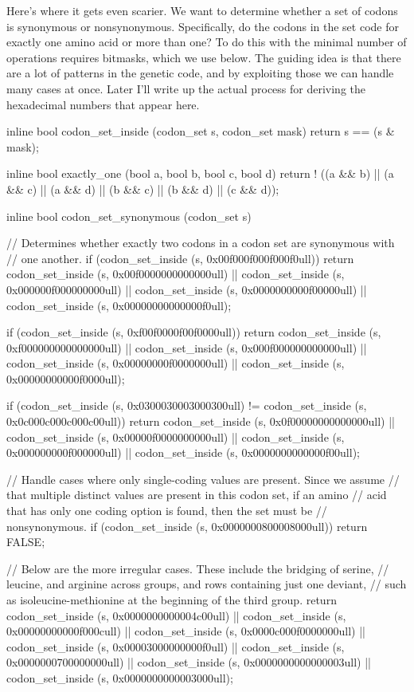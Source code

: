 \documentclass{article}
\begin{document}
      Here's where it gets even scarier. We want to determine whether a set of
      codons is synonymous or nonsynonymous. Specifically, do the codons in the
      set code for exactly one amino acid or more than one? To do this with the
      minimal number of operations requires bitmasks, which we use below. The
      guiding idea is that there are a lot of patterns in the genetic code, and
      by exploiting those we can handle many cases at once. Later I'll write up
      the actual process for deriving the hexadecimal numbers that appear here.

\begin{ccode}
inline bool codon_set_inside (codon_set s, codon_set mask)
  {return s == (s & mask);}

inline bool exactly_one (bool a, bool b, bool c, bool d) {
  return ! ((a && b) || (a && c) || (a && d) ||
          (b && c) || (b && d) || (c && d));
}

inline bool codon_set_synonymous (codon_set s) {
  // Determines whether exactly two codons in a codon set are synonymous with
  // one another.
  if (codon_set_inside (s, 0x00f000f000f000f0ull))
    return codon_set_inside (s, 0x00f0000000000000ull) ||
	   codon_set_inside (s, 0x000000f000000000ull) ||
	   codon_set_inside (s, 0x0000000000f00000ull) ||
	   codon_set_inside (s, 0x00000000000000f0ull);

  if (codon_set_inside (s, 0xf00f0000f00f0000ull))
    return codon_set_inside (s, 0xf000000000000000ull) ||
	   codon_set_inside (s, 0x000f000000000000ull) ||
	   codon_set_inside (s, 0x00000000f0000000ull) ||
	   codon_set_inside (s, 0x00000000000f0000ull);

  if (codon_set_inside (s, 0x0300030003000300ull) !=
      codon_set_inside (s, 0x0c000c000c000c00ull))
    return codon_set_inside (s, 0x0f00000000000000ull) ||
	   codon_set_inside (s, 0x00000f0000000000ull) ||
	   codon_set_inside (s, 0x000000000f000000ull) ||
	   codon_set_inside (s, 0x0000000000000f00ull);

  // Handle cases where only single-coding values are present. Since we assume
  // that multiple distinct values are present in this codon set, if an amino
  // acid that has only one coding option is found, then the set must be
  // nonsynonymous.
  if (codon_set_inside (s, 0x0000000800008000ull))
    return FALSE;

  // Below are the more irregular cases. These include the bridging of serine,
  // leucine, and arginine across groups, and rows containing just one deviant,
  // such as isoleucine-methionine at the beginning of the third group.
  return  codon_set_inside (s, 0x0000000000004c00ull) ||
	  codon_set_inside (s, 0x00000000000f000cull) ||
	  codon_set_inside (s, 0x0000c000f0000000ull) ||
	  codon_set_inside (s, 0x00003000000000f0ull) ||
	  codon_set_inside (s, 0x0000000700000000ull) ||
	  codon_set_inside (s, 0x0000000000000003ull) ||
	  codon_set_inside (s, 0x0000000000003000ull);
}
\end{ccode}
\end{document}
